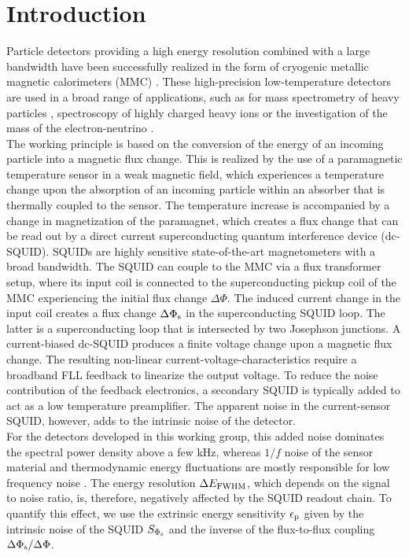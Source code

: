 \chapter{Introduction}

Particle detectors providing a high energy resolution combined with a large bandwidth have been successfully realized in the form of cryogenic metallic magnetic calorimeters (MMC) \cite{Enss2005a}. These high-precision low-temperature detectors are used in a broad range of applications, such as for mass spectrometry of heavy particles \cite{Gamer2019}, spectroscopy of highly charged heavy ions \cite{Hengstler2017} or the investigation of the mass of the electron-neutrino \cite{Gastaldo2017}. \\
The working principle is based on the conversion of the energy of an incoming particle into a magnetic flux change. This is realized by the use of a paramagnetic temperature sensor in a weak magnetic field, which experiences a temperature change upon the absorption of an incoming particle within an absorber that is thermally coupled to the sensor. The temperature increase is accompanied by a change in magnetization of the paramagnet, which creates a flux change that can be read out by a direct current superconducting quantum interference device (dc-SQUID). SQUIDs are highly sensitive state-of-the-art magnetometers with a broad bandwidth. The SQUID can couple to the MMC via a flux transformer setup, where its input coil is connected to the superconducting pickup coil of the MMC experiencing the initial flux change $\Delta\Phi$. The induced current change in the input coil creates a flux change $\Delta\Phi_{\rm s}$ in the superconducting SQUID loop. The latter is a superconducting loop that is intersected by two Josephson junctions. A current-biased dc-SQUID produces a finite voltage change upon a magnetic flux change. The resulting non-linear current-voltage-characteristics require a broadband FLL feedback to linearize the output voltage. To reduce the noise contribution of the feedback electronics, a secondary SQUID is typically added to act as a low temperature preamplifier. The apparent noise in the current-sensor SQUID, however, adds to the intrinsic noise of the detector. \\
For the detectors developed in this working group, this added noise dominates the spectral power density above a few kHz, whereas $1/f$ noise of the sensor material and thermodynamic energy fluctuations are mostly responsible for low frequency noise \cite{Kempf2018}. The energy resolution $\Delta E_{\rm FWHM}$, which depends on the signal to noise ratio, is, therefore, negatively affected by the SQUID readout chain. To quantify this effect, we use the extrinsic energy sensitivity $\epsilon_{\rm p}$ given by the intrinsic noise of the SQUID $S_{\Phi_{\rm s}}$ and the inverse of the flux-to-flux coupling $\Delta\Phi_{\rm s}/\Delta\Phi$. \\

